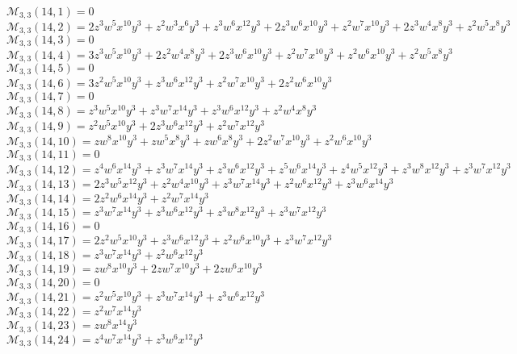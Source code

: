 \documentclass[12pt]{memoireuqam1.3}
\begin{document}
$\mathcal{M}_{3,3}(14,1)=0$\\
$\mathcal{M}_{3,3}(14,2)=2z^3w^5x^{10}y^3+z^2w^3x^6y^3+z^3w^6x^{12}y^3+2z^3w^6x^{10}y^3+z^2w^7x^{10}y^3+2z^3w^4x^8y^3+z^2w^5x^8y^3$\\
$\mathcal{M}_{3,3}(14,3)=0$\\
$\mathcal{M}_{3,3}(14,4)=3z^3w^5x^{10}y^3+2z^2w^4x^8y^3+2z^3w^6x^{10}y^3+z^2w^7x^{10}y^3+z^2w^6x^{10}y^3+z^2w^5x^8y^3$\\
$\mathcal{M}_{3,3}(14,5)=0$\\
$\mathcal{M}_{3,3}(14,6)=3z^2w^5x^{10}y^3+z^3w^6x^{12}y^3+z^2w^7x^{10}y^3+2z^2w^6x^{10}y^3$\\
$\mathcal{M}_{3,3}(14,7)=0$\\
$\mathcal{M}_{3,3}(14,8)=z^3w^5x^{10}y^3+z^3w^7x^{14}y^3+z^3w^6x^{12}y^3+z^2w^4x^8y^3$\\
$\mathcal{M}_{3,3}(14,9)=z^2w^5x^{10}y^3+2z^3w^6x^{12}y^3+z^2w^7x^{12}y^3$\\
$\mathcal{M}_{3,3}(14,10)=zw^8x^{10}y^3+zw^5x^8y^3+zw^6x^8y^3+2z^2w^7x^{10}y^3+z^2w^6x^{10}y^3$\\
$\mathcal{M}_{3,3}(14,11)=0$\\
$\mathcal{M}_{3,3}(14,12)=z^4w^6x^{14}y^3+z^3w^7x^{14}y^3+z^3w^6x^{12}y^3+z^5w^6x^{14}y^3+z^4w^5x^{12}y^3+z^3w^8x^{12}y^3+z^3w^7x^{12}y^3$\\
$\mathcal{M}_{3,3}(14,13)=2z^3w^5x^{12}y^3+z^2w^4x^{10}y^3+z^3w^7x^{14}y^3+z^2w^6x^{12}y^3+z^3w^6x^{14}y^3$\\
$\mathcal{M}_{3,3}(14,14)=2z^2w^6x^{14}y^3+z^2w^7x^{14}y^3$\\
$\mathcal{M}_{3,3}(14,15)=z^3w^7x^{14}y^3+z^3w^6x^{12}y^3+z^3w^8x^{12}y^3+z^3w^7x^{12}y^3$\\
$\mathcal{M}_{3,3}(14,16)=0$\\
$\mathcal{M}_{3,3}(14,17)=2z^2w^5x^{10}y^3+z^3w^6x^{12}y^3+z^2w^6x^{10}y^3+z^3w^7x^{12}y^3$\\
$\mathcal{M}_{3,3}(14,18)=z^3w^7x^{14}y^3+z^2w^6x^{12}y^3$\\
$\mathcal{M}_{3,3}(14,19)=zw^8x^{10}y^3+2zw^7x^{10}y^3+2zw^6x^{10}y^3$\\
$\mathcal{M}_{3,3}(14,20)=0$\\
$\mathcal{M}_{3,3}(14,21)=z^2w^5x^{10}y^3+z^3w^7x^{14}y^3+z^3w^6x^{12}y^3$\\
$\mathcal{M}_{3,3}(14,22)=z^2w^7x^{14}y^3$\\
$\mathcal{M}_{3,3}(14,23)=zw^8x^{14}y^3$\\
$\mathcal{M}_{3,3}(14,24)=z^4w^7x^{14}y^3+z^3w^6x^{12}y^3$\\
\end{document}
